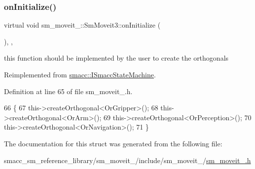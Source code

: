 \subsubsection{\texorpdfstring{on\+Initialize()}{onInitialize()}}
{\footnotesize\ttfamily virtual void sm\+\_\+moveit\+\_\+::\+Sm\+Moveit3\+::on\+Initialize (\begin{DoxyParamCaption}{ }\end{DoxyParamCaption})\hspace{0.3cm}{\ttfamily [inline]}, {\ttfamily [override]}, {\ttfamily [virtual]}}



this function should be implemented by the user to create the orthogonals 



Reimplemented from \hyperlink{classsmacc_1_1ISmaccStateMachine_ac2982c6c8283663e5e1e8a7c82f511ec}{smacc\+::\+I\+Smacc\+State\+Machine}.



Definition at line 65 of file sm\+\_\+moveit\+\_.\+h.


\begin{DoxyCode}
66     \{
67         this->createOrthogonal<OrGripper>();
68         this->createOrthogonal<OrArm>();
69         this->createOrthogonal<OrPerception>();
70         this->createOrthogonal<OrNavigation>();
71     \}
\end{DoxyCode}


The documentation for this struct was generated from the following file\+:\begin{DoxyCompactItemize}
\item 
smacc\+\_\+sm\+\_\+reference\+\_\+library/sm\+\_\+moveit\+\_/include/sm\+\_\+moveit\+\_/\hyperlink{sm__moveit__3_8h}{sm\+\_\+moveit\+\_.\+h}\end{DoxyCompactItemize}
